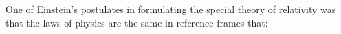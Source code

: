 One of Einstein's postulates in formulating the special theory of relativity 
was that the laws of physics are the same in reference frames that: